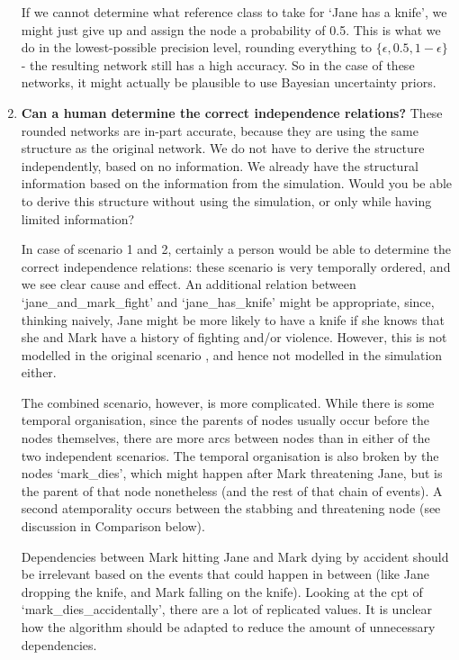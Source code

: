 \begin{enumerate}
If we cannot determine what reference class to take for `Jane has a knife', we might just give up and assign the node a probability of 0.5. This is what we do in the lowest-possible precision level, rounding everything to $\{\epsilon, 0.5 , 1-\epsilon\}$ - the resulting network still has a high accuracy. So in the case of these networks, it might actually be plausible to use Bayesian uncertainty priors.


\item \textbf{ Can a human determine the correct independence relations?}
These rounded networks are in-part accurate, because they are using the same structure as the original network. We do not have to derive the structure independently, based on no information. We already have the structural information based on the information from the simulation. Would you be able to derive this structure without using the simulation, or only while having limited information?

In case of scenario 1 and 2, certainly a person would be able to determine the correct independence relations: these scenario is very temporally ordered, and we see clear cause and effect. An additional relation between `jane\_and\_mark\_fight' and `jane\_has\_knife' might be appropriate, since, thinking naively, Jane might be more likely to have a knife if she knows that she and Mark have a history of fighting and/or violence. However, this is not modelled in the original scenario \citep{Vlek2015}, and hence not modelled in the simulation either.

The combined scenario, however, is more complicated. While there is some temporal organisation, since the parents of nodes usually occur before the nodes themselves, there are more arcs between nodes than in either of the two independent scenarios. The temporal organisation is also broken by the nodes `mark\_dies', which might happen after Mark threatening Jane, but is the parent of that node nonetheless (and the rest of that chain of events). A second atemporality occurs between the stabbing and threatening node (see discussion in Comparison below). 

Dependencies between Mark hitting Jane and Mark dying by accident should be irrelevant based on the events that could happen in between (like Jane dropping the knife, and Mark falling on the knife). Looking at the cpt of `mark\_dies\_accidentally', there are a lot of replicated values. It is unclear how the algorithm should be adapted to reduce the amount of unnecessary dependencies.
\end{enumerate}


